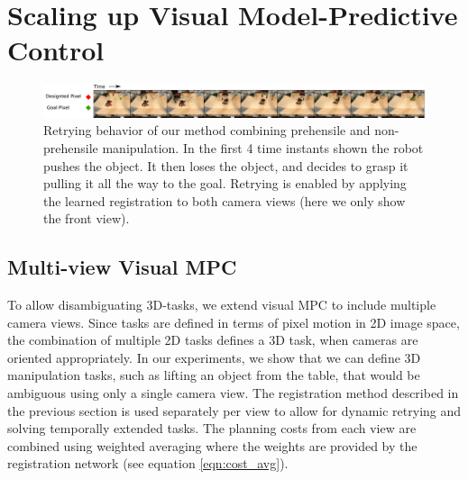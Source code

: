 \section{Scaling up Visual Model-Predictive Control}
\begin{figure}
	\centering
	\includegraphics[width=1.0\textwidth]{images_rfr/pick_place_plush.pdf}
	\caption{\small{Retrying behavior of our method combining prehensile and non-prehensile manipulation. In the first 4 time instants shown the robot pushes the object. It then loses the object, and decides to grasp it pulling it all the way to the goal. Retrying is enabled by applying the learned registration to both camera views (here we only show the front view).}}
	\label{fig:push_grasp}
	
\end{figure}


\label{sec:scalingup}
\subsection{Multi-view Visual MPC}
To allow disambiguating 3D-tasks, we extend visual MPC to include multiple camera views. Since tasks are defined in terms of pixel motion in 2D image space, the combination of multiple 2D tasks defines a 3D task, when cameras are oriented appropriately. In our experiments, we show that we can define 3D manipulation tasks, such as lifting an object from the table, that would be ambiguous using only a single camera view. The registration method described in the previous section is used separately per view to allow for dynamic retrying and solving temporally extended tasks. The planning costs from each view are combined using weighted averaging where the weights are provided by the registration network (see equation \ref{eqn:cost_avg}). 

